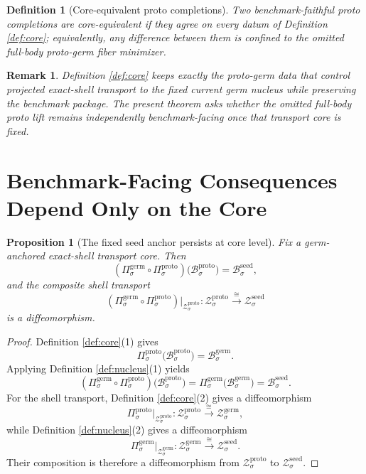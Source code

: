 \documentclass[11pt]{article}
\newcommand{\SeedBody}[1]{\mathcal B_{#1}^{\mathrm{seed}}}
\newcommand{\SeedShell}[1]{\mathcal Z_{#1}^{\mathrm{seed}}}
\newcommand{\GermBody}[1]{\mathcal B_{#1}^{\mathrm{germ}}}
\newcommand{\GermProj}[1]{\Pi_{#1}^{\mathrm{germ}}}
\newcommand{\GermShell}[1]{\mathcal Z_{#1}^{\mathrm{germ}}}
\newcommand{\ProtoBody}[1]{\mathcal B_{#1}^{\mathrm{proto}}}
\newcommand{\ProtoProj}[1]{\Pi_{#1}^{\mathrm{proto}}}
\newcommand{\ProtoShell}[1]{\mathcal Z_{#1}^{\mathrm{proto}}}
\newtheorem{definition}{Definition}
\newtheorem{proposition}{Proposition}
\newtheorem{remark}{Remark}
\begin{document}
\begin{definition}[Core-equivalent proto completions]
\label{def:equiv}
Two benchmark-faithful proto completions are \emph{core-equivalent} if they agree on every datum of Definition \ref{def:core}; equivalently, any difference between them is confined to the omitted full-body proto-germ fiber minimizer.
\end{definition}

\begin{remark}
Definition \ref{def:core} keeps exactly the proto-germ data that control projected exact-shell transport to the fixed current germ nucleus while preserving the benchmark package. The present theorem asks whether the omitted full-body proto lift remains independently benchmark-facing once that transport core is fixed.
\end{remark}

\section{Benchmark-Facing Consequences Depend Only on the Core}

\begin{proposition}[The fixed seed anchor persists at core level]
\label{prop:anchor}
Fix a germ-anchored exact-shell transport core. Then
\[
(\GermProj{\sigma}\circ\ProtoProj{\sigma})\bigl(\ProtoBody{\sigma}\bigr)
=
\SeedBody{\sigma},
\]
and the composite shell transport
\[
(\GermProj{\sigma}\circ\ProtoProj{\sigma})\big|_{\ProtoShell{\sigma}}
:
\ProtoShell{\sigma}
\xrightarrow{\cong}
\SeedShell{\sigma}
\]
is a diffeomorphism.
\end{proposition}

\begin{proof}
Definition \ref{def:core}(1) gives
\[
\ProtoProj{\sigma}\bigl(\ProtoBody{\sigma}\bigr)=\GermBody{\sigma}.
\]
Applying Definition \ref{def:nucleus}(1) yields
\[
(\GermProj{\sigma}\circ\ProtoProj{\sigma})\bigl(\ProtoBody{\sigma}\bigr)
=
\GermProj{\sigma}\bigl(\GermBody{\sigma}\bigr)
=
\SeedBody{\sigma}.
\]
For the shell transport, Definition \ref{def:core}(2) gives a diffeomorphism
\[
\ProtoProj{\sigma}\big|_{\ProtoShell{\sigma}}
:
\ProtoShell{\sigma}
\xrightarrow{\cong}
\GermShell{\sigma},
\]
while Definition \ref{def:nucleus}(2) gives a diffeomorphism
\[
\GermProj{\sigma}\big|_{\GermShell{\sigma}}
:
\GermShell{\sigma}
\xrightarrow{\cong}
\SeedShell{\sigma}.
\]
Their composition is therefore a diffeomorphism from \(\ProtoShell{\sigma}\) to \(\SeedShell{\sigma}\).
\end{proof}
\end{document}
